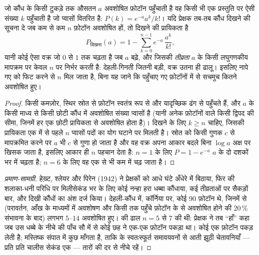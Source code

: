 \begin{theorem}[फ़ोटॉन गिनना: दिखने की बारंबारता]\label{thm:b3:sensory-systems:hecht}
जो कौंध  के किसी टुकड़े तक औसतन $a$ अवशोषित फ़ोटॉन पहुँचाती है
वह किसी भी एक प्रस्तुति पर ऐसी संख्या $k$ पहुँचाती है जो प्वासों
वितरित है: $P(k) = e^{-a}a^{k}/k!$। यदि प्रेक्षक तब-तब कौंध दिखने की
सूचना दे जब कम से कम $n$ फ़ोटॉन अवशोषित हों, तो दिखने की प्रायिकता है
\[
P_{\text{दिखना}}(a) = 1 - \sum_{k=0}^{n-1} e^{-a}\,\frac{a^{k}}{k!} ,
\]
यानी कोई ऐसा वक्र जो $0$ से $1$ तक चढ़ता है जब $a$ बढ़े, और जिसकी
\emph{तीव्रता} $a$ के किसी लघुगणकीय मापक्रम पर केवल $n$ पर निर्भर
करती है: देहली-गिनती जितनी बड़ी, वक्र उतना ही ढालू। इसलिए नापे गए
 को फिट करने से $n$ मिल जाता है, बिना यह जाने कि
पहुँचाए गए फ़ोटॉनों में से सचमुच कितने अवशोषित हुए।
\end{theorem}
\begin{proof}
किसी कमज़ोर, स्थिर स्रोत से फ़ोटॉन स्वतंत्र रूप से और यादृच्छिक ढंग से
पहुँचते हैं, और $a$ के किसी माध्य से किसी छोटी कौंध में अवशोषित संख्या
प्वासों है (यानी अनेक फ़ोटॉनों वाले किसी द्विपद की सीमा, जिनमें हर एक
छोटी प्रायिकता से अवशोषित होता है)। दिखने के लिए $k \ge n$ चाहिए,
जिसकी प्रायिकता एक में से पहले $n$ प्वासों पदों का योग घटाने पर मिलती
है। स्रोत को किसी गुणक $c$ से मापक्रमित करने पर $a$ भी $c$ से गुणा हो
जाता है और वह वक्र अपना आकार बदले बिना $\log a$ अक्ष पर खिसक जाता है,
इसलिए आकार ही $n$ पहचान देता है: $n =
1$ के लिए $P = 1 - e^{-a}$ $a$ के दो दशकों भर में चढ़ता है; $n = 6$ के
लिए वह एक से भी कम में चढ़ जाता है।
\end{proof}

\begin{proof}[प्रमाण-सामग्री]
हेख़्ट, श्लेयर और पिरेन (1942) ने प्रेक्षकों को आधे घंटे अँधेरे में
बिठाया, फिर  की शलाका-धनी परिधि पर मिलीसेकंड भर के लिए कोई
नन्हा हरा धब्बा कौंधाया, कई तीव्रताओं पर सैकड़ों बार, और दिखी कौंधों का
अंश दर्ज किया। देहली-कौंध में, कॉर्निया पर, कोई $90$ फ़ोटॉन थे, जिनमें
से (परावर्तन, आँख के माध्यमों में अवशोषण और किसी  तक पहुँचे
फ़ोटॉन के  से अवशोषित होने की $20\,\%$ संभावना के बाद) लगभग
$5$--$14$ अवशोषित हुए।  की ढाल
$n = 5$ से $7$ की थी: प्रेक्षक ने तब ``हाँ'' कहा जब उस धब्बे के नीचे
की पाँच सौ  में से कोई छह ने एक-एक फ़ोटॉन पकड़ा था। कोई  एक
फ़ोटॉन पकड़ लेती है; मस्तिष्क संपात में कुछ माँगता है, ताकि  के
स्वतःस्फूर्त समावयवनों से आती झूठी चेतावनियाँ --- प्रति  प्रति
चालीस सेकंड एक --- तारों की दर से नीचे रहें।
\end{proof}

